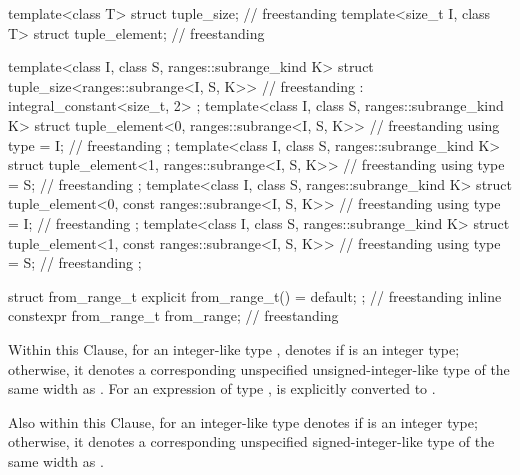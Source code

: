 \begin{codeblock}
{  template<class T> struct tuple_size;                                              // freestanding
  template<size_t I, class T> struct tuple_element;                                 // freestanding

  template<class I, class S, ranges::subrange_kind K>
  struct tuple_size<ranges::subrange<I, S, K>>                                      // freestanding
    : integral_constant<size_t, 2> {};
  template<class I, class S, ranges::subrange_kind K>
  struct tuple_element<0, ranges::subrange<I, S, K>> {                              // freestanding
    using type = I;                                                                 // freestanding
  };
  template<class I, class S, ranges::subrange_kind K>
  struct tuple_element<1, ranges::subrange<I, S, K>> {                              // freestanding
    using type = S;                                                                 // freestanding
  };
  template<class I, class S, ranges::subrange_kind K>
  struct tuple_element<0, const ranges::subrange<I, S, K>> {                        // freestanding
    using type = I;                                                                 // freestanding
  };
  template<class I, class S, ranges::subrange_kind K>
  struct tuple_element<1, const ranges::subrange<I, S, K>> {                        // freestanding
    using type = S;                                                                 // freestanding
  };

  struct from_range_t { explicit from_range_t() = default; };                       // freestanding
  inline constexpr from_range_t from_range{};                                       // freestanding
}
\end{codeblock}

\pnum
{}%
%
Within this Clause,
for an integer-like type ,
 denotes
 if  is an integer type;
otherwise, it denotes a corresponding unspecified unsigned-integer-like type
of the same width as .
For an expression  of type ,
 is
 explicitly converted to
.

\pnum
Also within this Clause,
 for an integer-like type 
denotes  if  is an integer type;
otherwise, it denotes a corresponding unspecified signed-integer-like type
of the same width as .

